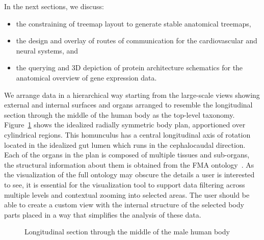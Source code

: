In the next sections, we discuss:
\begin{itemize}
  \item the constraining of treemap layout to generate stable anatomical treemaps,
  \item the design and overlay of routes of communication for the cardiovascular and neural systems, and
  \item the querying and 3D depiction of protein architecture schematics for the anatomical overview of gene expression data.
\end{itemize}

We arrange data in a hierarchical way starting from the large-scale views showing external and internal surfaces and organs
arranged to resemble the longitudinal section through the middle of the human body as the top-level taxonomy.
Figure~\ref{fig:application} shows the idealized radially symmetric body plan, apportioned over cylindrical regions.
This homunculus has a central longitudinal axis of rotation located in the idealized gut lumen which runs in the cephalocaudal direction.
Each of the organs in the plan is composed of multiple tissues and sub-organs, the structural information about them is obtained from the FMA ontology~\cite{RM03}. As the visualization of the full ontology may obscure the details a user is interested to see, it is essential for the visualization tool to support data filtering across multiple levels and contextual zooming into selected areas. The user should be able to create a custom view with the internal structure of the selected body parts placed in a way that simplifies the analysis of these data.

\begin{figure}
\centering
  \caption{Longitudinal section through the middle of the male human body}
  \label{fig:application}
\end{figure}

